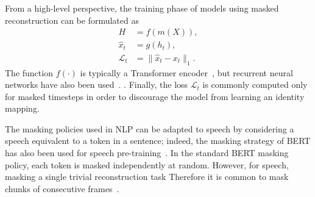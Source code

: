 From a high-level perspective, the training phase of models using masked
reconstruction can be formulated as
\begin{align}
    H &= f(m(X)), \\
    \hat{x}_t &= g(h_{t}), \\
    \mathcal{L}_t &= \lVert \hat{x}_{t} - x_{t} \rVert_1 .
\end{align}
The function $f(\cdot)$ is typically a Transformer encoder~\cite{liu2020mockingjay,jiang2019improving,liu2020masked}, but recurrent neural networks have also been used~\cite{wang2020unsupervised}.  . Finally, the loss $\mathcal{L}_t$ is commonly computed only for masked timesteps in order to discourage the model from learning an identity mapping.




The masking policies used in NLP can be adapted to speech by considering a speech  equivalent to a token in a sentence; indeed, the masking strategy of BERT has also been used for speech pre-training~\cite{liu2020mockingjay}.
In the standard BERT masking policy, each token is masked independently at random. However, for speech, masking a single  trivial reconstruction task  Therefore it is common to mask chunks of consecutive frames~\cite{liu2020mockingjay,jiang2021further}. 

